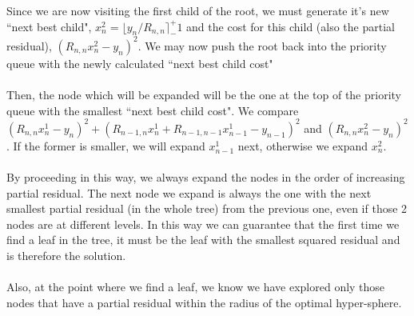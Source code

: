 \documentclass[11pt]{article}	%
\numberwithin{algorithm}{section}
\begin{document}
Since we are now visiting the first child of the root, we must generate it's new ``next best child", $x_n^2 = \lfloor y_n/R_{n,n}\rceil ^+_- 1$ and the cost for this child (also the partial residual), $(R_{n,n}x_n^2 - y_n)^2$. We may now push the root back into the priority queue with the newly calculated ``next best child cost"\\\\
Then, the node which will be expanded will be the one at the top of the priority queue with the smallest ``next best child cost". We compare $(R_{n,n}x_n^1 - y_n)^2 + (R_{n-1,n}x_n^1 + R_{n-1,n-1}x_{n-1}^1 - y_{n-1})^2$ and $(R_{n,n}x_n^2 - y_n)^2$. If the former is smaller, we will expand $x_{n-1}^1$ next, otherwise we expand $x_n^2$.\\\\
By proceeding in this way, we always expand the nodes in the order of increasing partial residual. The next node we expand is always the one with the next smallest partial residual (in the whole tree) from the previous one, even if those 2 nodes are at different levels. In this way we can guarantee that the first time we find a leaf in the tree, it must be the leaf with the smallest squared residual and is therefore the solution.\\\\
Also, at the point where we find a leaf, we know we have explored only those nodes that have a partial residual within the radius of the optimal hyper-sphere.
\end{document}
